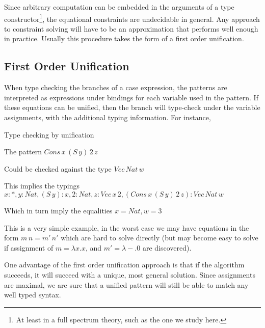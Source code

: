 Since arbitrary computation can be embedded in the arguments of a type constructor\footnote{
  At least in a full spectrum theory, such as the one we study here.
  }, the equational constraints are undecidable in general.
Any approach to constraint solving will have to be an approximation that performs well enough in practice.
Usually this procedure takes the form of a first order unification. 




\subsection{First Order Unification}

When type checking the branches of a case expression, the patterns are interpreted as expressions under bindings for each variable used in the pattern.
If these equations can be unified, then the branch will type-check under the variable assignments, with the additional typing information.
For instance,
\begin{example}
Type checking by unification

The pattern $Cons\,x\,\left(S\,y\right)\,2\,z$

Could be checked against the type $Vec\,Nat\,w$

This implies the typings $x:*,y:Nat,\left(S\,y\right):x,2:Nat,z:Vec\,x\,2,\left(Cons\,x\,\left(S\,y\right)\,2\,z\right):Vec\,Nat\,w$

Which in turn imply the equalities $x=Nat,w=3$
\end{example}

This is a very simple example, in the worst case we may have equations in the form $m\,n=m'\,n'$ which are hard to solve directly (but may become easy to solve if assignment of $m=\lambda x.x$, and $m'=\lambda-.0$ are discovered).

One advantage of the first order unification approach is that if the algorithm succeeds, it will succeed with a unique, most general solution.
Since assignments are maximal, we are sure that a unified pattern will still be able to match any well typed syntax.

